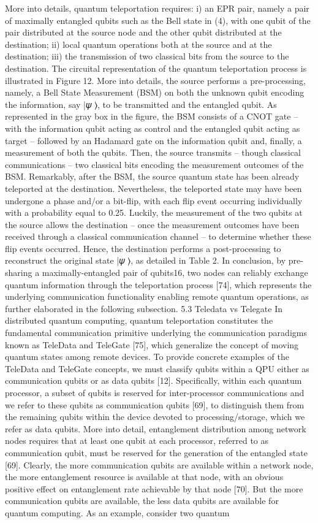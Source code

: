More into details, quantum teleportation requires: i) an EPR pair, namely a pair of maximally entangled qubits such as the Bell state in (4), with one qubit of the pair distributed at the source node and the other qubit distributed at the destination; ii) local quantum operations both at the source and at the destination; iii) the transmission of two classical bits from the source to the destination. The circuital representation of the quantum teleportation process is illustrated in Figure 12. More into details, the source performs a pre-processing, namely, a Bell State Measurement (BSM) on both the unknown qubit encoding the information, say |𝜓 ⟩, to be transmitted and the entangled qubit. As represented in the gray box in the figure, the BSM consists of a CNOT gate – with the information qubit acting as control and the entangled qubit acting as target – followed by an Hadamard gate on the information qubit and, finally, a measurement of both the qubits. Then, the source transmits – though classical communications – two classical bits encoding the measurement outcomes of the BSM. Remarkably, after the BSM, the source quantum state has been already teleported at the destination. Nevertheless, the teleported state may have been undergone a phase and/or a bit-flip, with each flip event occurring individually with a probability equal to 0.25. Luckily, the measurement of the two qubits at the source allows the destination – once the measurement outcomes have been received through a classical communication channel – to determine whether these flip events occurred. Hence, the destination performs a post-processing to reconstruct the original state |𝜓 ⟩, as detailed in Table 2. In conclusion, by pre-sharing a maximally-entangled pair of qubits16, two nodes can reliably exchange quantum information through the teleportation process [74], which represents the underlying communication functionality enabling remote quantum operations, as further elaborated in the following subsection. 5.3 Teledata vs Telegate In distributed quantum computing, quantum teleportation constitutes the fundamental communication primitive underlying the communication paradigms known as TeleData and TeleGate [75], which generalize the concept of moving quantum states among remote devices. To provide concrete examples of the TeleData and TeleGate concepts, we must classify qubits within a QPU either as communication qubits or as data qubits [12]. Specifically, within each quantum processor, a subset of qubits is reserved for inter-processor communications and we refer to these qubits as communication qubits [69], to distinguish them from the remaining qubits within the device devoted to processing/storage, which we refer as data qubits. More into detail, entanglement distribution among network nodes requires that at least one qubit at each processor, referred to as communication qubit, must be reserved for the generation of the entangled state [69]. Clearly, the more communication qubits are available within a network node, the more entanglement resource is available at that node, with an obvious positive effect on entanglement rate achievable by that node [70]. But the more communication qubits are available, the less data qubits are available for quantum computing. As an example, consider two quantum 